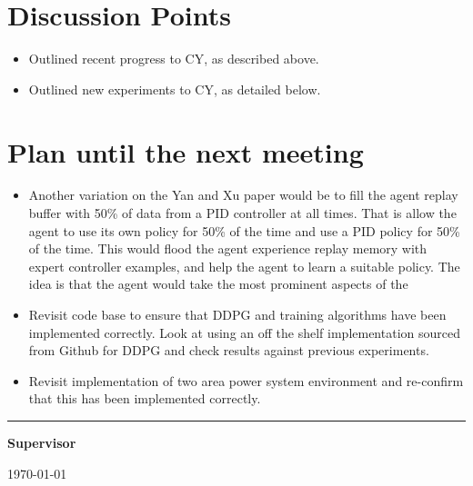 \documentclass[12pt]{article}
\begin{document}
	\section{Discussion Points}
	\begin{itemize}
		\item Outlined recent progress to CY, as described above.
		\item Outlined new experiments to CY, as detailed below.
	\end{itemize}
	\section{Plan until the next meeting}
	\begin{itemize}
		\item Another variation on the Yan and Xu paper would be to fill the agent replay buffer with 50\% of data from a PID controller at all times. That is allow the agent to use its own policy for 50\% of the time and use a PID policy for 50\% of the time. This would flood the agent experience replay memory with expert controller examples, and help the agent to learn a suitable policy. The idea is that the agent would take the most prominent aspects of the 
		\item Revisit code base to ensure that DDPG and training algorithms have been implemented correctly. Look at using an off the shelf implementation sourced from Github for DDPG and check results against previous experiments.
		\item Revisit implementation of two area power system environment and re-confirm that this has been implemented correctly.
	\end{itemize}
	\par
	\vspace{\fill}%
	\noindent\rule{0.4\linewidth}{0.5pt}%
	\vspace{1em}%
	\par
	\noindent\textbf{Supervisor}\vspace{1em}%
	\par
	\noindent\today
\end{document}
